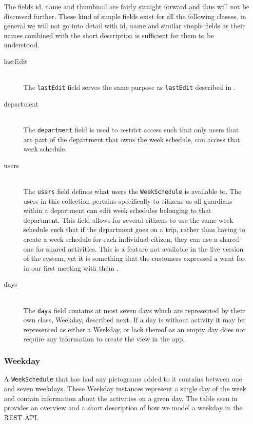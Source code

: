 \noindent
The fields id, name and thumbnail are fairly straight forward and thus will not be discussed further.
These kind of simple fields exist for all the following classes, in general we will not go into detail with id, name and similar simple fields as their names combined with the short description is sufficient for them to be understood.
\begin{description}
    \item [lastEdit] \hfill \\ 
    The \texttt{lastEdit} field serves the same purpose as \texttt{lastEdit} described in .
    \item [department] \hfill \\
    The \texttt{department} field is used to restrict access such that only users that are part of the department that owns the week schedule, can access that week schedule.
    \item [users] \hfill \\
    The \texttt{users} field defines what users the \texttt{WeekSchedule} is available to.
    The users in this collection pertains specifically to citizens as all guardians within a department can edit week schedules belonging to that department.
    This field allows for several citizens to use the same week schedule such that if the department goes on a trip, rather than having to create a week schedule for each individual citizen, they can use a shared one for shared activities.
    This is a feature not available in the live version of the system, yet it is something that the customers expressed a want for in our first meeting with them \citep{GIRAF20161stMeeting}.
    \item [days] \hfill \\
    The \texttt{days} field contains at most seven days which are represented by their own class, Weekday, described next.
    If a day is without activity it may be represented as either a Weekday, or lack thereof as an empty day does not require any information to create the view in the app.
\end{description}

\subsubsection{Weekday}
A \texttt{WeekSchedule} that has had any pictograms added to it contains between one and seven weekdays.
These Weekday instances represent a single day of the week and contain information about the activities on a given day.
The table seen in  provides an overview and a short description of how we model a weekday in the REST API.

